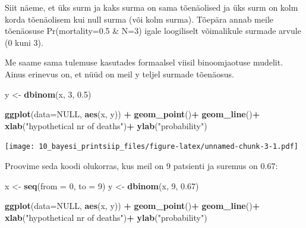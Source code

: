 \documentclass[]{book}
\newenvironment{Shaded}{\begin{snugshade}}{\end{snugshade}}
\newcommand{\KeywordTok}[1]{\textcolor[rgb]{0.13,0.29,0.53}{\textbf{#1}}}
\newcommand{\DataTypeTok}[1]{\textcolor[rgb]{0.13,0.29,0.53}{#1}}
\newcommand{\DecValTok}[1]{\textcolor[rgb]{0.00,0.00,0.81}{#1}}
\newcommand{\FloatTok}[1]{\textcolor[rgb]{0.00,0.00,0.81}{#1}}
\newcommand{\StringTok}[1]{\textcolor[rgb]{0.31,0.60,0.02}{#1}}
\newcommand{\OtherTok}[1]{\textcolor[rgb]{0.56,0.35,0.01}{#1}}
\newcommand{\OperatorTok}[1]{\textcolor[rgb]{0.81,0.36,0.00}{\textbf{#1}}}
\newcommand{\NormalTok}[1]{#1}
\begin{document}
Siit näeme, et üks surm ja kaks surma on sama tõenäolised ja üks surm on
kolm korda tõenäolisem kui null surma (või kolm surma). Tõepära annab
meile tõenäosuse Pr(mortality=0.5 \& N=3) igale loogiliselt võimalikule
surmade arvule (0 kuni 3).

Me saame sama tulemuse kasutades formaalsel viisil binoomjaotuse
mudelit. Ainus erinevus on, et nüüd on meil y teljel surmade tõenäosus.

\begin{Shaded}
\begin{Highlighting}[]
\NormalTok{y <-}\StringTok{ }\KeywordTok{dbinom}\NormalTok{(x, }\DecValTok{3}\NormalTok{, }\FloatTok{0.5}\NormalTok{)}

\KeywordTok{ggplot}\NormalTok{(}\DataTypeTok{data=}\OtherTok{NULL}\NormalTok{, }\KeywordTok{aes}\NormalTok{(x, y)) }\OperatorTok{+}\StringTok{ }
\StringTok{  }\KeywordTok{geom_point}\NormalTok{()}\OperatorTok{+}
\StringTok{  }\KeywordTok{geom_line}\NormalTok{()}\OperatorTok{+}
\StringTok{  }\KeywordTok{xlab}\NormalTok{(}\StringTok{"hypothetical nr of deaths"}\NormalTok{)}\OperatorTok{+}\StringTok{ }
\StringTok{  }\KeywordTok{ylab}\NormalTok{(}\StringTok{"probability"}\NormalTok{)}
\end{Highlighting}
\end{Shaded}

\texttt{[image: 10\_bayesi\_printsiip\_files/figure-latex/unnamed-chunk-3-1.pdf]}

Proovime seda koodi olukorras, kus meil on 9 patsienti ja suremus on
0.67:

\begin{Shaded}
\begin{Highlighting}[]
\NormalTok{x <-}\StringTok{ }\KeywordTok{seq}\NormalTok{(}\DataTypeTok{from =} \DecValTok{0}\NormalTok{, }\DataTypeTok{to =} \DecValTok{9}\NormalTok{)}
\NormalTok{y <-}\StringTok{ }\KeywordTok{dbinom}\NormalTok{(x, }\DecValTok{9}\NormalTok{, }\FloatTok{0.67}\NormalTok{)}

\KeywordTok{ggplot}\NormalTok{(}\DataTypeTok{data=}\OtherTok{NULL}\NormalTok{, }\KeywordTok{aes}\NormalTok{(x, y)) }\OperatorTok{+}\StringTok{ }
\StringTok{  }\KeywordTok{geom_point}\NormalTok{()}\OperatorTok{+}
\StringTok{  }\KeywordTok{geom_line}\NormalTok{()}\OperatorTok{+}
\StringTok{  }\KeywordTok{xlab}\NormalTok{(}\StringTok{"hypothetical nr of deaths"}\NormalTok{)}\OperatorTok{+}\StringTok{ }
\StringTok{  }\KeywordTok{ylab}\NormalTok{(}\StringTok{"probability"}\NormalTok{)}
\end{Highlighting}
\end{Shaded}
\end{document}
